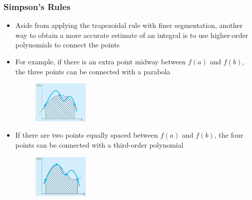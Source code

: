 \documentclass{if-beamer}
\begin{document}
\begin{frame}[t]
	\frametitle{Simpson's Rules}
	\begin{itemize}
		\item Aside from applying the trapezoidal rule with finer segmentation, another way to obtain a more accurate estimate of an integral is to use higher-order polynomials to connect the
		points
		\item For example, if there is an extra point midway between $f(a)$ and $f(b)$, the three
		points can be connected with a parabola
		\begin{figure}
			\centering
			\includegraphics[width=0.25\textwidth]{figures/parab}
		\end{figure}
		\item  If there are two points equally spaced between $f(a)$ and $f(b)$, the four points can be connected with a third-order polynomial
		\begin{figure}
			\centering
			\includegraphics[width = 0.25\textwidth]{figures/other}
		\end{figure}
	\end{itemize}
\end{frame}	
\end{document}
